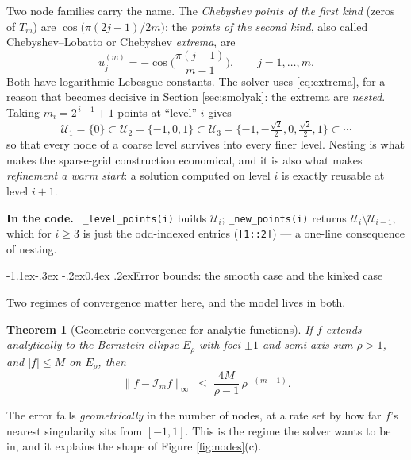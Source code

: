 \documentclass[10pt,a4paper]{article}
\makeatletter
\theoremstyle{definition}
\theoremstyle{plain}
\newtheorem{thm}[defn]{Theorem}
\theoremstyle{remark}
\newenvironment{codehint}%
  {\par\vspace{2pt}\begin{framed}\noindent\small\textcolor{codeblue}{\textbf{In the code.}}\ }%
  {\end{framed}\vspace{2pt}}
\newcommand{\code}[1]{\texttt{#1}}
\newcommand{\Tcheb}{T}
\renewcommand\subsection{\@startsection{subsection}{2}{\z@}%
  {-1.1ex\@plus -.3ex \@minus -.2ex}{0.4ex \@plus .2ex}{\normalfont\normalsize\bfseries}}
\makeatother
\begin{document}
Two node families carry the name. The \emph{Chebyshev points of the first kind} (zeros of
$\Tcheb_m$) are $\cos\!\big(\pi(2j{-}1)/2m\big)$; the \emph{points of the second kind}, also
called Chebyshev--Lobatto or Chebyshev \emph{extrema}, are
\begin{equation}
  u_j^{(m)} = -\cos\!\Big(\frac{\pi (j-1)}{m-1}\Big),\qquad j=1,\dots,m.
  \label{eq:extrema}
\end{equation}
Both have logarithmic Lebesgue constants. The solver uses \eqref{eq:extrema}, for a reason
that becomes decisive in Section \ref{sec:smolyak}: the extrema are \emph{nested}. Taking
$m_i = 2^{\,i-1}+1$ points at ``level'' $i$ gives
\begin{equation}
  \mathcal{U}_1 = \{0\} \subset \mathcal{U}_2 = \{-1,0,1\} \subset \mathcal{U}_3 =
  \{-1,-\tfrac{\sqrt2}{2},0,\tfrac{\sqrt2}{2},1\}\subset \cdots
\end{equation}
so that every node of a coarse level survives into every finer level. Nesting is what makes
the sparse-grid construction economical, and it is also what makes \emph{refinement a warm
start}: a solution computed on level $i$ is exactly reusable at level $i{+}1$.

\begin{codehint}
\code{\_level\_points(i)} builds $\mathcal{U}_i$; \code{\_new\_points(i)} returns
$\mathcal{U}_i\setminus\mathcal{U}_{i-1}$, which for $i\ge 3$ is just the odd-indexed
entries (\code{[1::2]}) --- a one-line consequence of nesting.
\end{codehint}

\subsection{Error bounds: the smooth case and the kinked case}

Two regimes of convergence matter here, and the model lives in both.

\begin{thm}[Geometric convergence for analytic functions]
\label{thm:geom}
If $f$ extends analytically to the Bernstein ellipse $E_\rho$ with foci $\pm 1$ and
semi-axis sum $\rho>1$, and $|f|\le M$ on $E_\rho$, then
\begin{equation}
  \|f-\mathcal{I}_m f\|_\infty \;\le\; \frac{4M}{\rho-1}\,\rho^{-(m-1)}.
\end{equation}
\end{thm}
\noindent The error falls \emph{geometrically} in the number of nodes, at a rate set by how
far $f$'s nearest singularity sits from $[-1,1]$. This is the regime the solver wants to be
in, and it explains the shape of Figure \ref{fig:nodes}(c).
\end{document}
